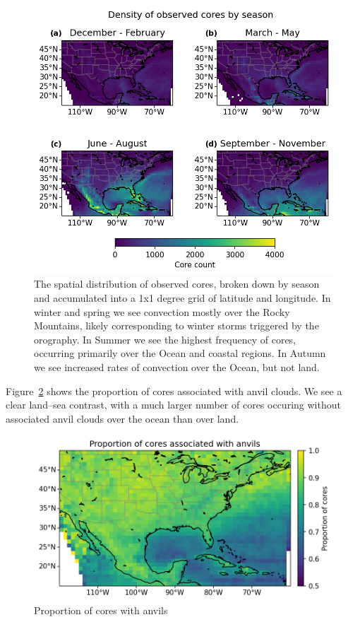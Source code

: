 \begin{figure}[tp]
    \centering
    \includegraphics[width=\textwidth]{figures/ch2_03.png}
    \caption{The spatial distribution of observed cores, broken down by season and accumulated into a 1x1 degree grid of latitude and longitude. In winter and spring we see convection mostly over the Rocky Mountains, likely corresponding to winter storms triggered by the orography. In Summer we see the highest frequency of cores, occurring primarily over the Ocean and coastal regions. In Autumn we see increased rates of convection over the Ocean, but not land. }
    \label{fig:core_density_by_season}
\end{figure}

Figure~\ref{fig:cores_with_anvils_map} shows the proportion of cores associated with anvil clouds.
We see a clear land--sea contrast, with a much larger number of cores occuring without associated anvil clouds over the ocean than over land.

\begin{figure}[tp]
    \centering
    \includegraphics[width=\textwidth]{figures/ch2_04.png}
    \caption{Proportion of cores with anvils}
    \label{fig:cores_with_anvils_map}
\end{figure}

